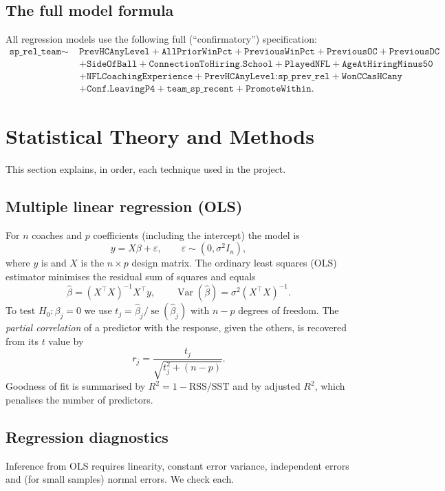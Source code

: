 \documentclass[11pt,a4paper]{article}
\newcommand{\var}[1]{\texttt{\detokenize{#1}}}
\newcommand{\Var}{\operatorname{Var}}
\begin{document}
\subsection{The full model formula}
All regression models use the following full (``confirmatory'') specification:
\begin{align*}
\texttt{sp\_rel\_team} \sim\;& \texttt{PrevHCAnyLevel} + \texttt{AllPriorWinPct} + \texttt{PreviousWinPct} + \texttt{PreviousOC} + \texttt{PreviousDC}\\
&+ \texttt{SideOfBall} + \texttt{ConnectionToHiring.School} + \texttt{PlayedNFL} + \texttt{AgeAtHiringMinus50}\\
&+ \texttt{NFLCoachingExperience} + \texttt{PrevHCAnyLevel:sp\_prev\_rel} + \texttt{WonCCasHCany}\\
&+ \texttt{Conf.LeavingP4} + \texttt{team\_sp\_recent} + \texttt{PromoteWithin}.
\end{align*}

\section{Statistical Theory and Methods}\label{sec:theory}
This section explains, in order, each technique used in the project.

\subsection{Multiple linear regression (OLS)}
For $n$ coaches and $p$ coefficients (including the intercept) the model is
\[
y = X\beta + \varepsilon,\qquad \varepsilon \sim (0,\sigma^2 I_n),
\]
where $y$ is \var{sp_rel_team} and $X$ is the $n\times p$ design matrix. The ordinary least squares (OLS) estimator minimises the residual sum of squares and equals
\[
\hat\beta = (X^\top X)^{-1}X^\top y,\qquad \Var(\hat\beta)=\sigma^2 (X^\top X)^{-1}.
\]
To test $H_0:\beta_j=0$ we use $t_j = \hat\beta_j / \operatorname{se}(\hat\beta_j)$ with $n-p$ degrees of freedom. The \emph{partial correlation} of a predictor with the response, given the others, is recovered from its $t$ value by
\[
r_{j} = \frac{t_j}{\sqrt{t_j^2 + (n-p)}}.
\]
Goodness of fit is summarised by $R^2 = 1-\mathrm{RSS}/\mathrm{SST}$ and by adjusted $R^2$, which penalises the number of predictors.

\subsection{Regression diagnostics}
Inference from OLS requires linearity, constant error variance, independent errors and (for small samples) normal errors. We check each.
\end{document}
